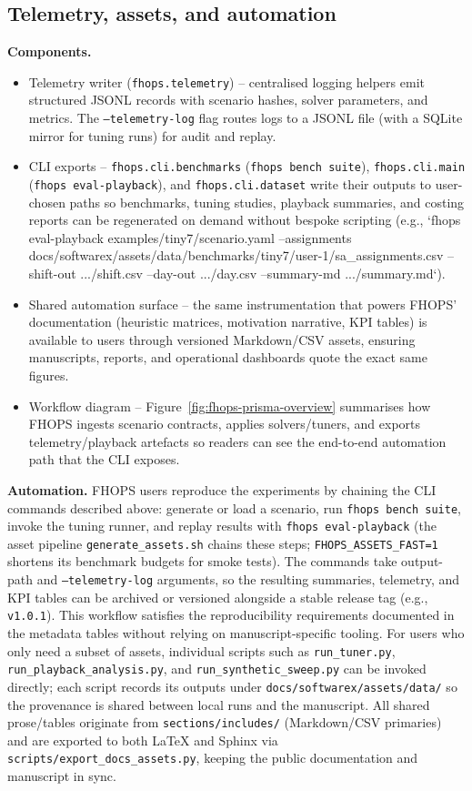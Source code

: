\subsection{Telemetry, assets, and automation}
\textbf{Components.}
\begin{itemize}
  \item Telemetry writer (\texttt{fhops.telemetry}) – centralised logging helpers emit structured JSONL records with scenario hashes, solver parameters, and metrics. The \texttt{--telemetry-log} flag routes logs to a JSONL file (with a SQLite mirror for tuning runs) for audit and replay.
  \item CLI exports – \texttt{fhops.cli.benchmarks} (\texttt{fhops bench suite}), \texttt{fhops.cli.main} (\texttt{fhops eval-playback}), and \texttt{fhops.cli.dataset} write their outputs to user-chosen paths so benchmarks, tuning studies, playback summaries, and costing reports can be regenerated on demand without bespoke scripting (e.g., `fhops eval-playback examples/tiny7/scenario.yaml --assignments docs/softwarex/assets/data/benchmarks/tiny7/user-1/sa\_assignments.csv --shift-out .../shift.csv --day-out .../day.csv --summary-md .../summary.md`).
  \item Shared automation surface – the same instrumentation that powers FHOPS’ documentation (heuristic matrices, motivation narrative, KPI tables) is available to users through versioned Markdown/CSV assets, ensuring manuscripts, reports, and operational dashboards quote the exact same figures.
  \item Workflow diagram – Figure~\ref{fig:fhops-prisma-overview} summarises how FHOPS ingests scenario contracts, applies solvers/tuners, and exports telemetry/playback artefacts so readers can see the end-to-end automation path that the CLI exposes.
\end{itemize}

\textbf{Automation.} FHOPS users reproduce the experiments by chaining the CLI commands described above: generate or load a scenario, run \texttt{fhops bench suite}, invoke the tuning runner, and replay results with \texttt{fhops eval-playback} (the asset pipeline \texttt{generate\_assets.sh} chains these steps; \texttt{FHOPS\_ASSETS\_FAST=1} shortens its benchmark budgets for smoke tests). The commands take output-path and \texttt{--telemetry-log} arguments, so the resulting summaries, telemetry, and KPI tables can be archived or versioned alongside a stable release tag (e.g., \texttt{v1.0.1}). This workflow satisfies the reproducibility requirements documented in the metadata tables without relying on manuscript-specific tooling. For users who only need a subset of assets, individual scripts such as \texttt{run\_tuner.py}, \texttt{run\_playback\_analysis.py}, and \texttt{run\_synthetic\_sweep.py} can be invoked directly; each script records its outputs under \texttt{docs/softwarex/assets/data/} so the provenance is shared between local runs and the manuscript. All shared prose/tables originate from \texttt{sections/includes/} (Markdown/CSV primaries) and are exported to both LaTeX and Sphinx via \texttt{scripts/export\_docs\_assets.py}, keeping the public documentation and manuscript in sync.
